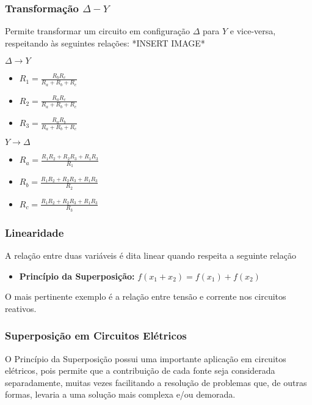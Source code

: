 \documentclass{article}
\numberwithin{equation}{section}
\begin{document}
    \subsubsection{Transformação $\Delta-Y$}
    Permite transformar um circuito em configuração $\Delta$ para $Y$ e vice-versa, respeitando às seguintes relações:
    *INSERT IMAGE*
    \begin{center}{$\Delta \longrightarrow Y$}\end{center}
    \begin{itemize}
        \item $R_1=\displaystyle\frac{R_bR_c}{R_a+R_b+R_c}$
        \item $R_2=\displaystyle\frac{R_aR_c}{R_a+R_b+R_c}$
        \item $R_3=\displaystyle\frac{R_aR_b}{R_a+R_b+R_c}$
    \end{itemize}
    \begin{center}{$Y \longrightarrow \Delta$}\end{center}
    \begin{itemize}
        \item $R_a=\displaystyle\frac{R_1R_2+R_2R_3+R_1R_3}{R_1}$
        \item $R_b=\displaystyle\frac{R_1R_2+R_2R_3+R_1R_3}{R_2}$
        \item $R_c=\displaystyle\frac{R_1R_2+R_2R_3+R_1R_3}{R_3}$
    \end{itemize}

    \subsubsection{Linearidade}
    A relação entre duas variáveis é dita linear quando respeita a seguinte relação
    \begin{itemize}
        \item \textbf{Princípio da Superposição:} $f(x_{1}+x_{2})= f(x_{1})+f(x_{2})$
    \end{itemize}
    O mais pertinente exemplo é a relação entre tensão e corrente nos circuitos reativos.

    \subsubsection{Superposição em Circuitos Elétricos}
    O Princípio da Superposição possui uma importante aplicação em circuitos elétricos, pois permite que a contribuição de cada fonte seja considerada separadamente, muitas vezes facilitando a resolução de problemas que, de outras formas, levaria a uma solução mais complexa e/ou demorada.
\end{document}
